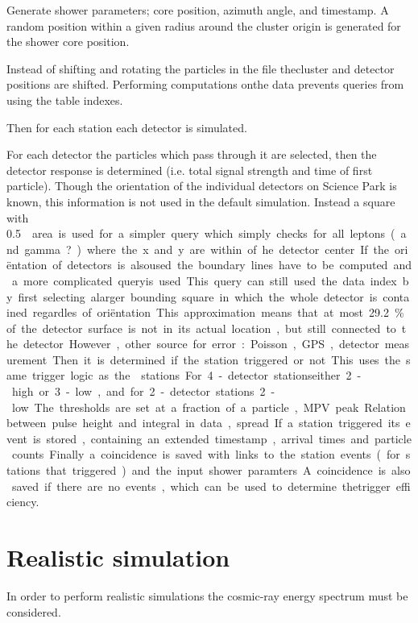 Generate shower parameters; core position, azimuth angle, and timestamp. A random position within a given radius around the cluster origin is generated for the shower core position.

Instead of shifting and rotating the particles in the \corsika file thecluster and detector positions are shifted. Performing computations onthe \corsika data prevents queries from using the table indexes.

Then for each station each detector is simulated.

For each detector the particles which pass through it are selected, then the detector response is determined (i.e. total signal strength and time of first particle). Though the orientation of the individual detectors on Science Park is known, this information is not used in the default simulation. Instead a square with \SI{.5}{\meter\square} area is used for a simpler query which simply checks for all leptons (and gamma?) where the x and y are within .. of he detector center. If the oriëntation of detectors is alsoused the boundary lines have to be computed and a more complicated queryis used. This query can still used the data index by first selecting alarger bounding square in which the whole detector is contained regardles of oriëntation. This approximation means that at most\SI{29.2}{\percent} of the detector surface is not in its actual location, but still connected to the detector. However, other source for error: Poisson, GPS, detector measurement.

Then it is determined if the station triggered or not. This uses the same trigger logic as the \hisparc stations. For 4-detector stationseither 2-high or 3-low, and for 2-detector stations 2-low. The thresholds are set at a fraction of a particle, MPV peak.. Relation between pulse height and integral in data, spread..

If a station triggered its event is stored, containing an extended timestamp, arrival times and particle counts.

Finally a coincidence is saved with links to the station events (for stations that triggered) and the input shower paramters. A coincidence is also saved if there are no events, which can be used to determine thetrigger efficiency.


\section{Realistic simulation}

In order to perform realistic simulations the cosmic-ray energy spectrum must be considered.

